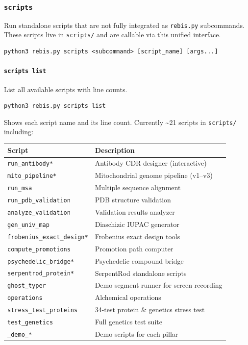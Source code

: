 \hypertarget{scripts-1}{%
\subsubsection{\texorpdfstring{\texttt{scripts}}{scripts}}\label{scripts-1}}

Run standalone scripts that are not fully integrated as
\texttt{rebis.py} subcommands. These scripts live in \texttt{scripts/}
and are callable via this unified interface.

\begin{verbatim}
python3 rebis.py scripts <subcommand> [script_name] [args...]
\end{verbatim}

\hypertarget{scripts-list}{%
\paragraph{\texorpdfstring{\texttt{scripts\ list}}{scripts list}}\label{scripts-list}}

List all available scripts with line counts.

\begin{verbatim}
python3 rebis.py scripts list
\end{verbatim}

Shows each script name and its line count. Currently \textasciitilde21
scripts in \texttt{scripts/} including:

\begin{longtable}[]{@{}ll@{}}
\toprule
Script & Description\tabularnewline
\midrule
\endhead
\texttt{run\_antibody*} & Antibody CDR designer
(interactive)\tabularnewline
\texttt{mito\_pipeline*} & Mitochondrial genome pipeline
(v1--v3)\tabularnewline
\texttt{run\_msa} & Multiple sequence alignment\tabularnewline
\texttt{run\_pdb\_validation} & PDB structure validation\tabularnewline
\texttt{analyze\_validation} & Validation results
analyzer\tabularnewline
\texttt{gen\_univ\_map} & Diaschizic IUPAC generator\tabularnewline
\texttt{frobenius\_exact\_design*} & Frobenius exact design
tools\tabularnewline
\texttt{compute\_promotions} & Promotion path computer\tabularnewline
\texttt{psychedelic\_bridge*} & Psychedelic compound
bridge\tabularnewline
\texttt{serpentrod\_protein*} & SerpentRod standalone
scripts\tabularnewline
\texttt{ghost\_typer} & Demo segment runner for screen
recording\tabularnewline
\texttt{operations} & Alchemical operations\tabularnewline
\texttt{stress\_test\_proteins} & 34-test protein \& genetics stress
test\tabularnewline
\texttt{test\_genetics} & Full genetics test suite\tabularnewline
\texttt{\_demo\_*} & Demo scripts for each pillar\tabularnewline
\bottomrule
\end{longtable}


